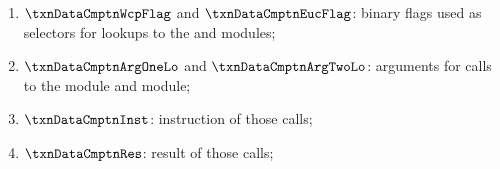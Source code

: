 \begin{enumerate}
	\item $\txnDataCmptnWcpFlag$ and $\txnDataCmptnEucFlag$:
		binary flags used as selectors for lookups
		to the \wcpMod{} and \eucMod{} modules;
	\item $\txnDataCmptnArgOneLo$ and $\txnDataCmptnArgTwoLo$:
		arguments for calls to the \wcpMod{} module and \eucMod{} module;
	\item $\txnDataCmptnInst$:
		instruction of those calls;
	\item $\txnDataCmptnRes$:
		result of those calls;
\end{enumerate}
